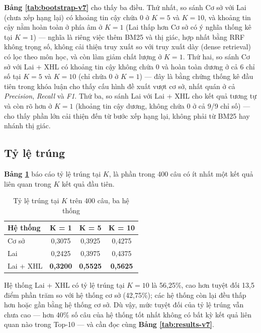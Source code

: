 \bigbreak\noindent
\textbf{Bảng \ref{tab:bootstrap-v7}} cho thấy ba điều. Thứ nhất, so sánh Cơ sở với Lai (chưa xếp hạng lại) có khoảng tin cậy chứa 0 ở $K = 5$ và $K = 10$, và khoảng tin cậy nằm hoàn toàn ở phía âm ở $K = 1$ (Lai thấp hơn Cơ sở có ý nghĩa thống kê tại $K = 1$) — nghĩa là riêng việc thêm BM25 và thị giác, hợp nhất bằng RRF không trọng số, không cải thiện truy xuất so với truy xuất dày (dense retrieval) có lọc theo môn học, và còn làm giảm chất lượng ở $K = 1$. Thứ hai, so sánh Cơ sở với Lai + XHL có khoảng tin cậy không chứa 0 và hoàn toàn dương ở cả 6 chỉ số tại $K = 5$ và $K = 10$ (chỉ chứa 0 ở $K = 1$) — đây là bằng chứng thống kê đầu tiên trong khóa luận cho thấy cấu hình đề xuất vượt cơ sở, nhất quán ở cả \textit{Precision}, \textit{Recall} và \textit{F1}. Thứ ba, so sánh Lai với Lai + XHL cho kết quả tương tự và còn rõ hơn ở $K = 1$ (khoảng tin cậy dương, không chứa 0 ở cả 9/9 chỉ số) — cho thấy phần lớn cải thiện đến từ bước xếp hạng lại, không phải từ BM25 hay nhánh thị giác.

\subsection{Tỷ lệ trúng}

\textbf{Bảng \ref{tab:hit-v7}} báo cáo tỷ lệ trúng tại $K$, là phần trong 400 câu có ít nhất một kết quả liên quan trong $K$ kết quả đầu tiên.

\begin{table}[ht]
    \centering
    \caption{Tỷ lệ trúng tại $K$ trên 400 câu, ba hệ thống}
    \label{tab:hit-v7}
    \begin{tabular}{|l|c|c|c|}
        \hline
        \textbf{Hệ thống} & \textbf{K = 1}  & \textbf{K = 5}  & \textbf{K = 10} \\
        \hline
        Cơ sở             & 0,3075          & 0,3925          & 0,4275          \\
        \hline
        Lai               & 0,2425          & 0,3975          & 0,4375          \\
        \hline
        Lai + XHL         & \textbf{0,3200} & \textbf{0,5525} & \textbf{0,5625} \\
        \hline
    \end{tabular}
\end{table}

\bigbreak\noindent
Hệ thống Lai + XHL có tỷ lệ trúng tại $K = 10$ là 56,25\%, cao hơn tuyệt đối 13,5 điểm phần trăm so với hệ thống cơ sở (42,75\%); các hệ thống còn lại đều thấp hơn hoặc gần bằng hệ thống cơ sở. Dù vậy, mức tuyệt đối của tỷ lệ trúng vẫn chưa cao — hơn 40\% số câu của hệ thống tốt nhất không có bất kỳ kết quả liên quan nào trong Top-10 — và cần đọc cùng \textbf{Bảng \ref{tab:results-v7}}.

